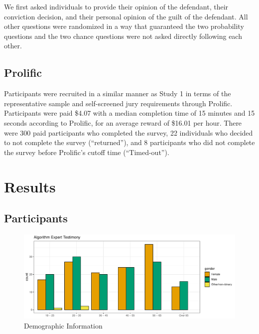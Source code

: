 \documentclass[print]{nuthesis}
\begin{document}
We first asked individuals to provide their opinion of the defendant, their conviction decision, and their personal opinion of the guilt of the defendant.
All other questions were randomized in a way that guaranteed the two probability questions and the two chance questions were not asked directly following each other.

\hypertarget{prolific-1}{%
\subsection{Prolific}\label{prolific-1}}

Participants were recruited in a similar manner as Study 1 in terms of the representative sample and self-screened jury requirements through Prolific.
Participants were paid \$4.07 with a median completion time of 15 minutes and 15 seconds according to Prolific, for an average reward of \$16.01 per hour.
There were 300 paid participants who completed the survey, 22 individuals who decided to not complete the survey (``returned''), and 8 participants who did not complete the survey before Prolific's cutoff time (``Timed-out'').

\hypertarget{results-2}{%
\section{Results}\label{results-2}}

\hypertarget{participants-1}{%
\subsection{Participants}\label{participants-1}}

\begin{figure}

{\centering \includegraphics[width=\linewidth]{thesis_files/figure-latex/demographics2-1} 

}

\caption{Demographic Information}\label{fig:demographics2}
\end{figure}
\end{document}
